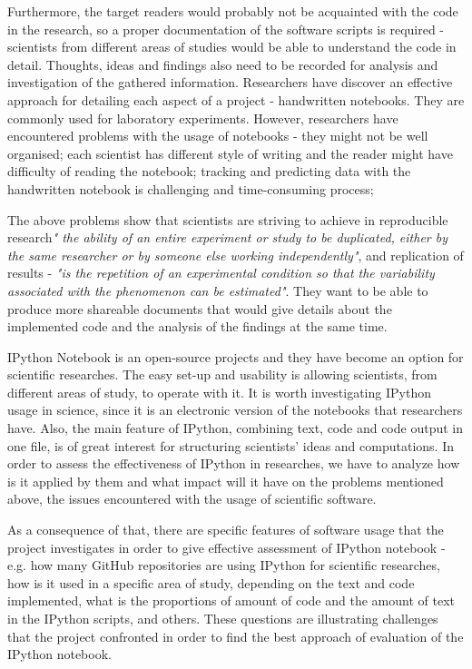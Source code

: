 Furthermore, the target readers would probably not be acquainted with the code in the research, so a proper documentation of the software scripts is required - scientists from different areas of studies would be able to understand the code in detail. Thoughts, ideas and findings also need to be recorded for analysis and investigation of the gathered information. Researchers have discover an effective approach for detailing each aspect of a project - handwritten notebooks.\cite{holmes2003reworking} They are commonly used for laboratory experiments. However, researchers have encountered problems with the usage of notebooks - they might not be well organised; each scientist has different style of writing and the reader might have difficulty of reading the notebook; tracking and predicting data with the handwritten notebook is challenging and time-consuming process;

The above problems show that scientists are striving to achieve in reproducible research\textit{" the ability of an entire experiment or study to be duplicated, either by the same researcher or by someone else working independently"}, and replication of results - \textit{"is the repetition of an experimental condition so that the variability associated with the phenomenon can be estimated"}. \cite{reproducibilityWiki} \cite{replicationWiki} They want to be able to produce more shareable documents that would give details about the implemented code and the analysis of the findings at the same time. 

IPython Notebook is an open-source projects and they have become an option for scientific researches. The easy set-up and usability is allowing scientists, from different areas of study, to operate with it. It is worth investigating IPython usage in science, since it is an electronic version of the notebooks that researchers have. Also, the main feature of IPython, combining text, code and code output in one file, is of great interest for structuring scientists' ideas and computations. In order to assess the effectiveness of IPython in researches, we have to analyze how is it applied by them and what impact will it have on the problems mentioned above, the issues encountered with the usage of scientific software. 

As a consequence of that, there are specific features of software usage that the project investigates in order to give effective assessment of IPython notebook - e.g. how many GitHub repositories are using IPython for scientific researches, how is it used in a specific area of study, depending on the text and code implemented, what is the proportions of amount of code and the amount of text in the IPython scripts, and others. These questions are illustrating challenges that the project confronted in order to find the best approach of evaluation of the IPython notebook.  


